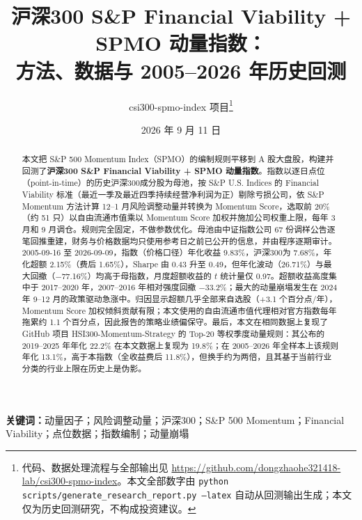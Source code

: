 \documentclass[11pt,a4paper]{article}
\begin{document}
\title{\LARGE\bfseries 沪深300 S\&P Financial Viability + SPMO 动量指数：\\[4pt]\Large 方法、数据与 2005--2026 年历史回测}
\author{csi300-spmo-index 项目\thanks{代码、数据处理流程与全部输出见 \url{https://github.com/dongzhaohe321418-lab/csi300-spmo-index}。本文全部数字由 \texttt{python scripts/generate\_research\_report.py --latex} 自动从回测输出生成；本文仅为历史回测研究，不构成投资建议。}}
\date{2026 年 9 月 11 日}
\maketitle
\thispagestyle{empty}
\begin{abstract}
本文把 S\&P 500 Momentum Index（SPMO）的编制规则平移到 A 股大盘股，构建并回测了\textbf{沪深300 S\&P Financial Viability + SPMO 动量指数}。指数以逐日点位（point-in-time）的历史沪深300成分股为母池，按 S\&P U.S. Indices 的 Financial Viability 标准（最近一季及最近四季持续经营净利润为正）剔除亏损公司，依 S\&P Momentum 方法计算 12--1 月风险调整动量并转换为 Momentum Score，选取前 20\%（约 51 只）以自由流通市值乘以 Momentum Score 加权并施加公司权重上限，每年 3 月和 9 月调仓。规则完全固定，不做参数优化。母池由中证指数公司 67 份调样公告逐笔回推重建，财务与价格数据均只使用参考日之前已公开的信息，并由程序逐期审计。2005-09-16 至 2026-09-09，指数（价格口径）年化收益 9.83\%，沪深300为 7.68\%，年化超额 2.15\%（费后 1.65\%），Sharpe 由 0.43 升至 0.49，但年化波动（26.71\%）与最大回撤（$-$77.16\%）均高于母指数，月度超额收益的 $t$ 统计量仅 0.97。超额收益高度集中于 2017--2020 年，2007--2016 年相对强度回撤 $-$33.2\%；最大的动量崩塌发生在 2024 年 9--12 月的政策驱动急涨中。归因显示超额几乎全部来自选股（+3.1 个百分点/年），Momentum Score 加权倾斜贡献有限；本文使用的自由流通市值代理相对官方指数每年拖累约 1.1 个百分点，因此报告的策略业绩偏保守。最后，本文在相同数据上复现了 GitHub 项目 HSI300-Momentum-Strategy 的 Top-20 等权季度动量规则：其公布的 2019--2025 年年化 22.2\% 在本文数据上复现为 19.8\%；在 2005--2026 年全样本上该规则年化 13.1\%，高于本指数（全收益费后 11.8\%），但换手约为两倍，且其基于当前行业分类的行业上限在历史上是伪影。
\end{abstract}
\begin{center}\begin{minipage}{0.86\textwidth}\small\noindent\textbf{关键词：}动量因子；风险调整动量；沪深300；S\&P 500 Momentum；Financial Viability；点位数据；指数编制；动量崩塌\end{minipage}\end{center}
\newpage\tableofcontents\vspace{1em}
\end{document}
